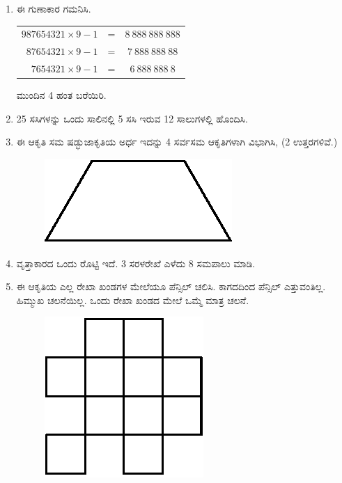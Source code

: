 \begin{enumerate}
\item ಈ ಗುಣಾಕಾರ ಗಮನಿಸಿ. 

\begin{tabular}[t]{r@{\;}c@{\;}c}
$987654321\times 9 - 1$ & = &  $8~888~888~888$\\
$87654321\times 9 - 1$ & = &  $7~888~888~88$\\
$7654321\times 9 - 1$ & = &  $6~888~888~8$
\end{tabular}

ಮುಂದಿನ 4 ಹಂತ ಬರೆಯಿರಿ. 

\vfill\eject

\item 25 ಸಸಿಗಳನ್ನು ಒಂದು ಸಾಲಿನಲ್ಲಿ 5 ಸಸಿ ಇರುವ 12 ಸಾಲುಗಳಲ್ಲಿ ಹೊಂದಿಸಿ. 

\item ಈ ಆಕೃತಿ ಸಮ ಷಡ್ಭುಜಾಕೃತಿಯ ಅರ್ಧ ಇದನ್ನು 4 ಸರ್ವಸಮ ಆಕೃತಿಗಳಾಗಿ ವಿಭಾಗಿಸಿ, (2 ಉತ್ತರಗಳಿವೆ.)

\vskip -0.3cm

\begin{figure}[H]
\centering
\includegraphics[scale=0.97]{images/chap9/q21.eps}
\end{figure}

\item ವೃತ್ತಾಕಾರದ ಒಂದು ರೊಟ್ಟಿ ಇದೆ. 3 ಸರಳರೇಖೆ ಎಳೆದು 8 ಸಮಪಾಲು ಮಾಡಿ. 

\item ಈ ಆಕೃತಿಯ ಎಲ್ಲ ರೇಖಾ ಖಂಡಗಳ ಮೇಲೆಯೂ ಪೆನ್ಸಿಲ್ ಚಲಿಸಿ. ಕಾಗದದಿಂದ ಪೆನ್ಸಿಲ್ ಎತ್ತುವಂತಿಲ್ಲ. ಹಿಮ್ಮುಖ ಚಲನೆಯಿಲ್ಲ. ಒಂದು ರೇಖಾ ಖಂಡದ ಮೇಲೆ ಒಮ್ಮೆ ಮಾತ್ರ ಚಲನೆ. 

\vskip -0.2cm

\begin{figure}[H]
\centering
\includegraphics[scale=0.97]{images/chap9/q23.eps}
\end{figure}


\end{enumerate}
